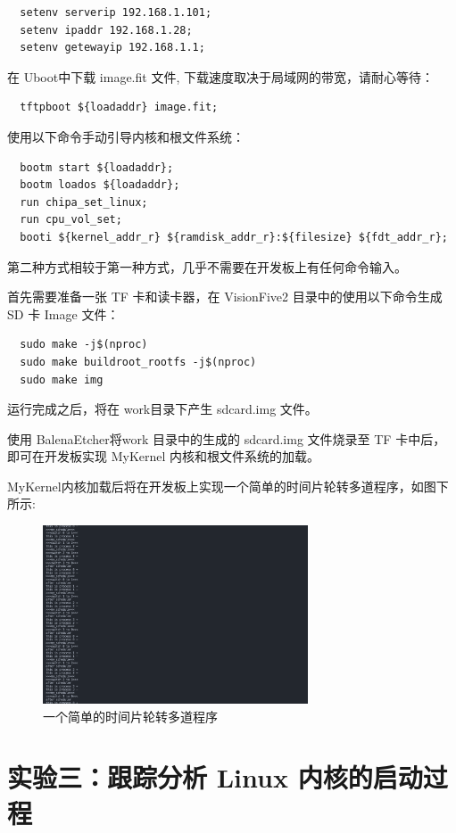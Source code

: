 \documentclass[lang=cn,10pt]{elegantbook}
\begin{document}
\begin{lstlisting}
  setenv serverip 192.168.1.101;
  setenv ipaddr 192.168.1.28;
  setenv getewayip 192.168.1.1;
\end{lstlisting}

在 Uboot中下载 image.fit 文件, 下载速度取决于局域网的带宽，请耐心等待：

\begin{lstlisting}
  tftpboot ${loadaddr} image.fit;
\end{lstlisting}

使用以下命令手动引导内核和根文件系统：
\begin{lstlisting}
  bootm start ${loadaddr};	
  bootm loados ${loadaddr};
  run chipa_set_linux;
  run cpu_vol_set;
  booti ${kernel_addr_r} ${ramdisk_addr_r}:${filesize} ${fdt_addr_r};
\end{lstlisting}

第二种方式相较于第一种方式，几乎不需要在开发板上有任何命令输入。

首先需要准备一张 TF 卡和读卡器，在 VisionFive2 目录中的使用以下命令生成SD 卡 Image 文件：
\begin{lstlisting}
  sudo make -j$(nproc)
  sudo make buildroot_rootfs -j$(nproc)
  sudo make img
\end{lstlisting}

运行完成之后，将在 work目录下产生 sdcard.img 文件。

使用 BalenaEtcher将work 目录中的生成的 sdcard.img 文件烧录至 TF 卡中后， 即可在开发板实现 MyKernel 内核和根文件系统的加载。

MyKernel内核加载后将在开发板上实现一个简单的时间片轮转多道程序，如图下所示:
\begin{figure}[htbp]
  \centering
  \includegraphics[width=0.7\textwidth]{image/mmexport1701419651344.png}
  \caption{一个简单的时间片轮转多道程序}
\end{figure}


\chapter{实验三：跟踪分析 Linux 内核的启动过程}
\end{document}
